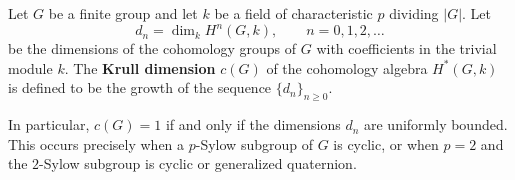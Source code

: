 Let $G$ be a finite group and let $k$ be a field of characteristic $p$ dividing $|G|$. Let
$$d_n = \dim_k H^n(G, k), \qquad n = 0, 1, 2, \ldots$$
be the dimensions of the cohomology groups of $G$ with coefficients in the trivial module $k$. The \textbf{Krull dimension} $c(G)$ of the cohomology algebra $H^*(G, k)$ is defined to be the growth of the sequence $\{d_n\}_{n \geq 0}$.

In particular, $c(G) = 1$ if and only if the dimensions $d_n$ are uniformly bounded. This occurs precisely when a $p$-Sylow subgroup of $G$ is cyclic, or when $p = 2$ and the $2$-Sylow subgroup is cyclic or generalized quaternion.
